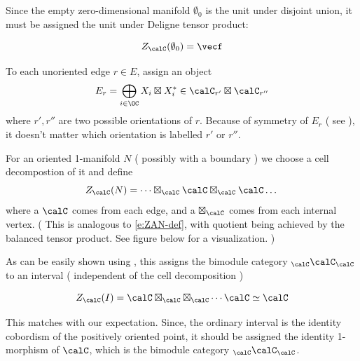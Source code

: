 Since the empty zero-dimensional manifold $\emptyset_0$ is the unit under disjoint union,
it must be assigned the unit under Deligne tensor product:

$$
Z_\calC( \emptyset_0)=\vecf
$$

To each unoriented edge $r \in E$, assign an object
\[
E_r = \bigoplus_{i \in \OC}  X_i \boxtimes X_i^* \in \calC_{r'} \boxtimes \calC_{r''}
\]
where $r',r''$ are two possible orientations of $r$. Because of symmetry of $E_r$ ( see  ),
 it doesn't matter which orientation is labelled $r'$ or $r''$.

For an oriented 1-manifold $N$ ( possibly with a boundary ) we choose a cell decompostion of it and define
\[
Z_\calC (N) = \dots \boxtimes_\calC \calC \boxtimes_\calC \calC \dots
\]
where a $\calC$ comes from each edge, and a $\boxtimes_\calC$ comes from each internal vertex. ( This is analogous to 
\eqref{e:ZAN-def}, with quotient being achieved by the balanced tensor product. See figure below for a visualization. )

\begin{center}
\end{center}

As can be easily shown using , this assigns the bimodule category 
$_\calC \calC_\calC$ to an interval ( independent of the cell decomposition )

$$
Z_\calC(I) =  \calC \boxtimes_\calC \boxtimes_\calC \cdots \calC \simeq \calC
$$


This matches with our expectation. Since, the ordinary interval is the identity cobordism of the 
positively oriented point, it should be assigned the identity 1-morphism of $\calC$, which is 
the bimodule category $_\calC \calC_\calC$.

